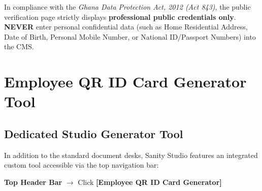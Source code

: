 \documentclass[11pt,a4paper,oneside]{book}
\begin{document}
\begin{alertbox}
In compliance with the \textit{Ghana Data Protection Act, 2012 (Act 843)}, the public verification page strictly displays \textbf{professional public credentials only}.
\textbf{NEVER} enter personal confidential data (such as Home Residential Address, Date of Birth, Personal Mobile Number, or National ID/Passport Numbers) into the CMS.
\end{alertbox}

\chapter{Employee QR ID Card Generator Tool}
\label{chap:qrtool}

\section{Dedicated Studio Generator Tool}
In addition to the standard document desks, Sanity Studio features an integrated custom tool accessible via the top navigation bar:
\begin{center}
  \textbf{Top Header Bar} $\longrightarrow$ Click \textbf{[Employee QR ID Card Generator]}
\end{center}
\end{document}
